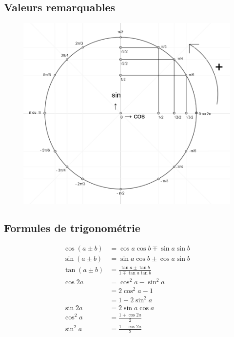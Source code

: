 \documentclass{article}
\begin{document}
\subsection{Valeurs remarquables}
\begin{figure}[htp]
\centering
\includegraphics[scale=0.25]{cercle-trigo-filled}
\caption{}
\label{}
\end{figure}

\subsection{Formules de trigonométrie}


\begin{align*}
	\cos(a \pm b) &= \cos a \cos b \mp \sin a \sin b \\
	\sin(a \pm b) &= \sin a \cos b \pm \cos a \sin b \\
	\tan(a \pm b) &= \frac{\tan a \pm \tan b}{1 \mp \tan a \tan b} \\
	\cos 2a &= \cos^2a-\sin^2a \\
			&= 2\cos^2a-1 \\
			&= 1-2\sin^2a \\
	\sin 2a &= 2\sin a \cos a \\
	\cos^2a&= \frac{1+\cos 2a}{2} \\
	\sin^2a&= \frac{1-\cos2a}{2} \\
\end{align*}
\end{document}
